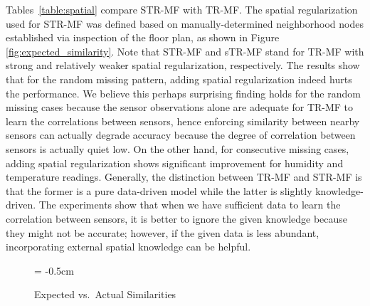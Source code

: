 Tables~\ref{table:spatial} compare STR-MF with TR-MF.
The spatial regularization used for STR-MF was defined based on manually-determined neighborhood nodes established via inspection of the floor plan, as shown in Figure \ref{fig:expected_similarity}.
Note that STR-MF and sTR-MF stand for TR-MF with strong and relatively weaker spatial regularization, respectively.
The results show that for the random missing pattern, adding spatial regularization indeed hurts the performance.
We believe this perhaps surprising finding holds for the random missing cases because the sensor observations alone are adequate for TR-MF to learn the correlations between sensors, hence enforcing similarity between nearby sensors can actually degrade accuracy because the degree of correlation between sensors is actually quiet low.
On the other hand, for consecutive missing cases, adding spatial regularization shows significant improvement for humidity and temperature readings.
Generally, the distinction between TR-MF and STR-MF is that the former is a pure data-driven model while the latter is slightly knowledge-driven.
The experiments show that when we have sufficient data to learn the correlation between sensors, it is better to ignore the given knowledge because they might not be accurate; however, if the given data is less abundant, incorporating external spatial knowledge can be helpful.


\begin{figure}[h]
\vspace{-0.2cm}
\subfigcapmargin = -0.5cm
\hspace{0.1cm}
\hspace{0.1cm}
\vspace{-0.3cm}
\caption{Expected vs.~Actual Similarities}
\label{fig:similarity}
\vspace{-0.3cm}
\end{figure}


